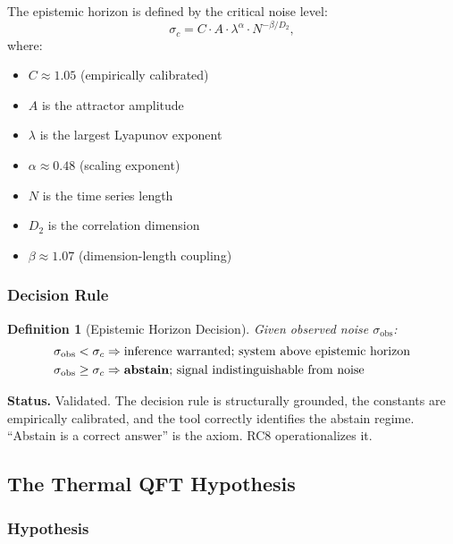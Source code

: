 \documentclass[11pt,twoside]{article}
\newtheorem{definition}{Definition}[section]
\begin{document}
The epistemic horizon is defined by the critical noise level:
\[
  \sigma_c = C \cdot A \cdot \lambda^{\alpha} \cdot N^{-\beta/D_2},
\]
where:
\begin{itemize}
  \item $C \approx 1.05$ (empirically calibrated)
  \item $A$ is the attractor amplitude
  \item $\lambda$ is the largest Lyapunov exponent
  \item $\alpha \approx 0.48$ (scaling exponent)
  \item $N$ is the time series length
  \item $D_2$ is the correlation dimension
  \item $\beta \approx 1.07$ (dimension-length coupling)
\end{itemize}

\subsubsection{Decision Rule}

\begin{definition}[Epistemic Horizon Decision]
Given observed noise $\sigma_{\mathrm{obs}}$:
\begin{align*}
  \sigma_{\mathrm{obs}} < \sigma_c &\Rightarrow \text{inference warranted; system above epistemic horizon}\\
  \sigma_{\mathrm{obs}} \geq \sigma_c &\Rightarrow \text{\textbf{abstain}; signal indistinguishable from noise}
\end{align*}
\end{definition}

\begin{confirmedenv}
\textbf{Status.} Validated. The decision rule is structurally grounded, the constants
are empirically calibrated, and the tool correctly identifies the abstain regime.
``Abstain is a correct answer'' is the axiom. RC8 operationalizes it.
\end{confirmedenv}

\subsection{The Thermal QFT Hypothesis}

\subsubsection{Hypothesis}
\end{document}
